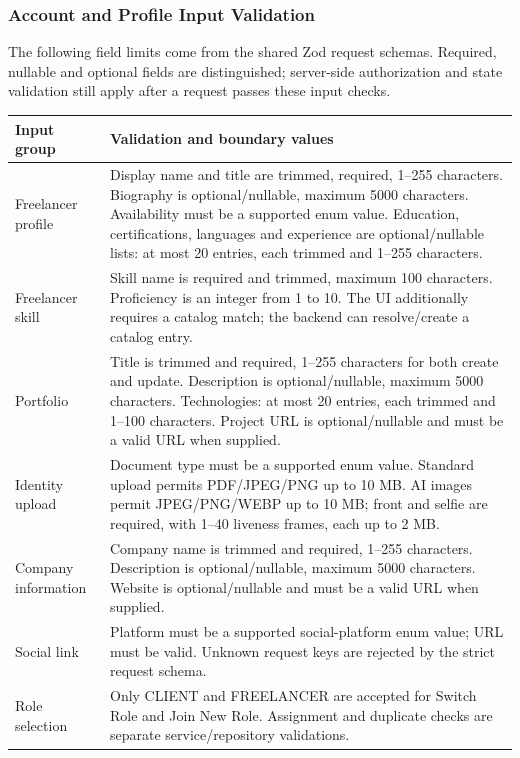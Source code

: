 \subsubsection{Account and Profile Input Validation}
The following field limits come from the shared Zod request schemas. Required,
nullable and optional fields are distinguished; server-side authorization and
state validation still apply after a request passes these input checks.

{\small\begin{longtable}{|L{3.3cm}|L{10.8cm}|}\hline
Input group & Validation and boundary values \\ \hline
Freelancer profile & Display name and title are trimmed, required, 1--255 characters. Biography is optional/nullable, maximum 5000 characters. Availability must be a supported enum value. Education, certifications, languages and experience are optional/nullable lists: at most 20 entries, each trimmed and 1--255 characters. \\ \hline
Freelancer skill & Skill name is required and trimmed, maximum 100 characters. Proficiency is an integer from 1 to 10. The UI additionally requires a catalog match; the backend can resolve/create a catalog entry. \\ \hline
Portfolio & Title is trimmed and required, 1--255 characters for both create and update. Description is optional/nullable, maximum 5000 characters. Technologies: at most 20 entries, each trimmed and 1--100 characters. Project URL is optional/nullable and must be a valid URL when supplied. \\ \hline
Identity upload & Document type must be a supported enum value. Standard upload permits PDF/JPEG/PNG up to 10 MB. AI images permit JPEG/PNG/WEBP up to 10 MB; front and selfie are required, with 1--40 liveness frames, each up to 2 MB. \\ \hline
Company information & Company name is trimmed and required, 1--255 characters. Description is optional/nullable, maximum 5000 characters. Website is optional/nullable and must be a valid URL when supplied. \\ \hline
Social link & Platform must be a supported social-platform enum value; URL must be valid. Unknown request keys are rejected by the strict request schema. \\ \hline
Role selection & Only CLIENT and FREELANCER are accepted for Switch Role and Join New Role. Assignment and duplicate checks are separate service/repository validations. \\ \hline

\end{longtable}}
